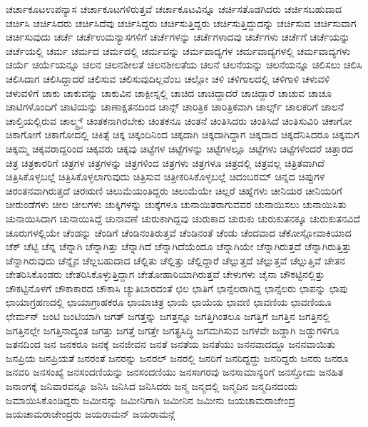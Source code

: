 {ಚರ್ಚಾಕೂಟಉಪನ್ಯಾಸ
ಚರ್ಚಾಕೂಟಗಳಿರುತ್ತವೆ
ಚರ್ಚಾಕೂಟವಿನ್ನೂ
ಚರ್ಚಿಸತೊಡಗಿದರು
ಚರ್ಚಿಸಬಹುದಾದ
ಚರ್ಚಿಸಿ
ಚರ್ಚಿಸಿದರು
ಚರ್ಚಿಸಿದೆವು
ಚರ್ಚಿಸಿದ್ದರು
ಚರ್ಚಿಸುತ್ತಿದ್ದರು
ಚರ್ಚಿಸುತ್ತಿದ್ದುದನ್ನು
ಚರ್ಚಿಸುವ
ಚರ್ಚಿಸುವಾಗ
ಚರ್ಚಿಸುವುದು
ಚರ್ಚೆ
ಚರ್ಚೆಉಮನ್ಯಾಸಗಳಿಗೆ
ಚರ್ಚೆಗಳನ್ನು
ಚರ್ಚೆಗಳಾದವು
ಚರ್ಚೆಗಳು
ಚರ್ಚೆಗೆ
ಚರ್ಚೆಯನ್ನು
ಚರ್ಚೆಯಲ್ಲಿ
ಚರ್ಮ
ಚರ್ಮದ
ಚರ್ಮದಲ್ಲಿ
ಚರ್ಮವನ್ನು
ಚರ್ಮವಾದ್ಯಗಳ
ಚರ್ಮವಾದ್ಯಗಳಲ್ಲಿ
ಚರ್ಮವಾದ್ಯಗಳು
ಚರ್ಯೆ
ಚರ್ಯೆಯನ್ನೂ
ಚಲನ
ಚಲನಶೀಲತೆ
ಚಲನಶೀಲತೆಯ
ಚಲನೆ
ಚಲನೆಯನ್ನು
ಚಲನೆಯನ್ನೂ
ಚಲಿಸಲು
ಚಲಿಸಿ
ಚಲಿಸಿದಾಗ
ಚಲಿಸಿದ್ದಾದರೆ
ಚಲಿಸುವ
ಚಲಿಸುವುದಿಲ್ಲವೆಂಬ
ಚಲ್ಲೋ
ಚಳಿ
ಚಳಿಗಾಲದಲ್ಲಿ
ಚಳಿಗಾಳಿ
ಚಳುವಳಿ
ಚಳುವಳಿಗೆ
ಚಾಕು
ಚಾಕುವನ್ನು
ಚಾಕುವಿನ
ಚಾಕ್ಪೀಸ್ನಲ್ಲಿ
ಚಾಚಿದ
ಚಾಚಿದ್ದಾದರೆ
ಚಾಚಿದ್ದಾರೆ
ಚಾಚುವ
ಚಾಚೂ
ಚಾಟಿಗಳೊಂದಿಗೆ
ಚಾಟಿಯನ್ನು
ಚಾಣಾಕ್ಷತನದಿಂದ
ಚಾನ್ಸ್
ಚಾರಿತ್ರಿಕ
ಚಾರಿತ್ರಿಕವಾಗಿ
ಚಾರ್ಲ್ಸ್
ಚಾಲಕರಿಗೆ
ಚಾಲನೆ
ಚಾಲ್ತಿಯಲ್ಲಿರುವ
ಚಾಲ್ಮ್ರ್ಸ್
ಚಿಂತಕನಾಗಿರಬೇಕು
ಚಿಂತಕನೂ
ಚಿಂತನೆ
ಚಿಂತಿಸಿದರು
ಚಿಂತಿಸಿದೆ
ಚಿಂತಿಸುವಿರಿ
ಚಿಕಾಗೋ
ಚಿಕಾಗೋಗೆ
ಚಿಕಾಗೋದಲ್ಲಿ
ಚಿಕಿತ್ಸೆ
ಚಿಕ್ಕ
ಚಿಕ್ಕಂದಿನಿಂದ
ಚಿಕ್ಕದಾಗಿ
ಚಿಕ್ಕದಾಗಿದ್ದಾಗ
ಚಿಕ್ಕದಾದ
ಚಿಕ್ಕದೆನಿಸಿದರೂ
ಚಿಕ್ಕಮಗ
ಚಿಕ್ಕಮ್ಮ
ಚಿಕ್ಕವರಾದ್ದರಿಂದ
ಚಿಕ್ಕವರು
ಚಿಕ್ಕವು
ಚಿಟ್ಟೆಗಳ
ಚಿಟ್ಟೆಗಳನ್ನು
ಚಿಟ್ಟೆಗಳಲ್ಲೂ
ಚಿಟ್ಟೆಗಳು
ಚಿಟ್ಟೆಗಳೆಂದರೆ
ಚಿತ್ತಾರದ
ಚಿತ್ರ
ಚಿತ್ರಕಾರರಿಗೆ
ಚಿತ್ರಗಳ
ಚಿತ್ರಗಳನ್ನು
ಚಿತ್ರಗಳಿಂದ
ಚಿತ್ರಗಳು
ಚಿತ್ರಗಳೂ
ಚಿತ್ರದಲ್ಲಿ
ಚಿತ್ರವಲ್ಲ
ಚಿತ್ರಿತವಾಗಿದೆ
ಚಿತ್ರಿಸಿಕೊಳ್ಳಬಲ್ಲೆ
ಚಿತ್ರಿಸಿಕೊಳ್ಳಲಾಗುವುದು
ಚಿತ್ರಿಸುವ
ಚಿತ್ರೀಕರಿಸಿಕೊಳ್ಳಬಲ್ಲೆ
ಚಿದಂಬರಮ್
ಚಿನ್ನದ
ಚಿಪ್ಪುಗಳ
ಚಿರಂತನವಾಗಿರುತ್ತದೆ
ಚಿರಋಣಿ
ಚಿಲುಮೆಯಂತಿದ್ದರು
ಚಿಲುಮೆಯೇ
ಚಿಲ್ಲರೆ
ಚಿಹ್ನೆಗಳು
ಚೀನಿಯರ
ಚೀನಿಯರಿಗೆ
ಚೀರುಂಡೆಗಳು
ಚೀಲ
ಚೀಲಗಳು
ಚುಕ್ಕಿಗಳನ್ನು
ಚುಕ್ಕೆಗಳೂ
ಚುನಾಯಿತರಾಗುವವರ
ಚುನಾಯಿಸಲು
ಚುನಾಯಿಸಿತು
ಚುನಾಯಿಸಿದಾಗ
ಚುನಾಯಿಸಿದ್ದೆ
ಚುನಾವಣೆ
ಚುರುಕಾಗಿದ್ದವು
ಚುರುಕಾದ
ಚುರುಕು
ಚುರುಕುತನಕ್ಕೂ
ಚುರುಕುತನವಿದೆ
ಚೂರುಗಳಲ್ಲಿಯೇ
ಚೆಂಡನ್ನು
ಚೆಂಡಿಗೆ
ಚೆಂಡಿನಂತಿರುತ್ತವೆ
ಚೆಂಡಿನಂತೆ
ಚೆಂಡು
ಚೆಂದವಾದ
ಚೆಕೋಸ್ಲೋವಾಕಿಯಾದ
ಚೆಕ್
ಚೆಟ್ಟಿ
ಚೆನ್ನ
ಚೆನ್ನಾಗಿ
ಚೆನ್ನಾಗಿತ್ತು
ಚೆನ್ನಾಗಿದೆ
ಚೆನ್ನಾಗಿದೆಯೆಂದೂ
ಚೆನ್ನಾಗಿಯೇ
ಚೆನ್ನಾಗಿರುತ್ತದೆ
ಚೆನ್ನಾಗಿರುತ್ತಿತ್ತು
ಚೆನ್ನಾಗಿರುವುದು
ಚೆನ್ನೈನ
ಚೆಲ್ಲಬಹುದಾದ
ಚೆಲ್ಲಿತು
ಚೆಲ್ಲಿತ್ತು
ಚೆಲ್ಲಿದ್ದಾರೆ
ಚೆಲ್ಲುತ್ತದೆ
ಚೆಲ್ಲುತ್ತವೆ
ಚೆಲ್ಲುತ್ತಿವೆ
ಚೇತನ
ಚೇತರಿಸಿಕೊಂಡರು
ಚೇತರಿಸಿಕೊಳ್ಳುತ್ತಿದ್ದಾಗ
ಚೇತೋಹಾರಿಯಾಗಿರುತ್ತವೆ
ಚೇಳುಗಳು
ಚೈನಾ
ಚೌಕಟ್ಟಿನಲ್ಲಿತ್ತು
ಚೌಕಟ್ಟಿನೊಳಗೆ
ಚೌಕಾಕಾರದ
ಚೌಕಾಸಿ
ಚ್ಯುತಿಬಾರದಂತೆ
ಛಲ
ಛಾತಿಗೆ
ಛಾನ್ಸೆಲರಾಗಿದ್ದ
ಛಾನ್ಸೆಲರು
ಛಾಪನ್ನು
ಛಾಪು
ಛಾಯಾಗ್ರಹಣದಲ್ಲಿ
ಛಾಯಾಗ್ರಾಹಕರೂ
ಛಾಯಾಚಿತ್ರ
ಛಾಯೆ
ಛಾಯೆಯ
ಛಾವಣಿ
ಛಾವಣಿಯ
ಛಾವಣಿಯೂ
ಛೇರ್ಮನ್
ಜಂಟಿ
ಜಂಟಿಯಾಗಿ
ಜಗತ್
ಜಗತ್ತನ್ನು
ಜಗತ್ತನ್ನೂ
ಜಗತ್ತಿಗಿಂತಲೂ
ಜಗತ್ತಿಗೆ
ಜಗತ್ತಿನ
ಜಗತ್ತಿನಲ್ಲಿ
ಜಗತ್ತಿನಲ್ಲೇ
ಜಗತ್ತಿನಾದ್ಯಂತ
ಜಗತ್ತು
ಜಗತ್ತೆ
ಜಗತ್ತೇ
ಜಗತ್ಪ್ರಸಿದ್ಧಿ
ಜಗಮಗಿಸುವ
ಜಗಳವೇ
ಜಡ್ಡಾಗಿ
ಜಡ್ಡುಗಳಿಗೂ
ಜತನದಿಂದ
ಜನ
ಜನಕರೂ
ಜನಕ್ಕೆ
ಜನಜೀವನ
ಜನತೆ
ಜನತೆಯ
ಜನತೆಯು
ಜನನವಾದದ್ದೂ
ಜನನವಾಯಿತು
ಜನಪ್ರಿಯ
ಜನಪ್ರಿಯತೆ
ಜನರಂತೆ
ಜನರನ್ನು
ಜನರಲ್
ಜನರಲ್ಲಿ
ಜನರಿಗೆ
ಜನರಿದ್ದದ್ದು
ಜನರಿದ್ದರು
ಜನರು
ಜನರೂ
ಜನವರಿ
ಜನಸಂಖ್ಯೆ
ಜನಸಂದಣಿಯನ್ನು
ಜನಸಂದಣಿಯು
ಜನಸಾಗರವು
ಜನಸಾಮಾನ್ಯರಿಗೆ
ಜನಸ್ತೋಮ
ಜನಹಿತ
ಜನಾಂಗಕ್ಕೆ
ಜನಿವಾರವನ್ನೂ
ಜನಿಸಿ
ಜನಿಸಿದ
ಜನಿಸಿದರು
ಜನ್ಮ
ಜನ್ಮದಲ್ಲಿ
ಜನ್ಮದಿನ
ಜನ್ಮದಿನದಂದು
ಜಮಾಯಿಸಿಕೊಂಡಿದ್ದರು
ಜಮೀನನ್ನು
ಜಮೀನಿಗಾಗಿ
ಜಮೀನಿನ
ಜಮೀನು
ಜಯಚಾಮರಾಜೇಂದ್ರ
ಜಯಚಾಮರಾಜೇಂದ್ರರು
ಜಯರಾಮನ್
ಜಯರಾಮನ್ಗೆ
}
